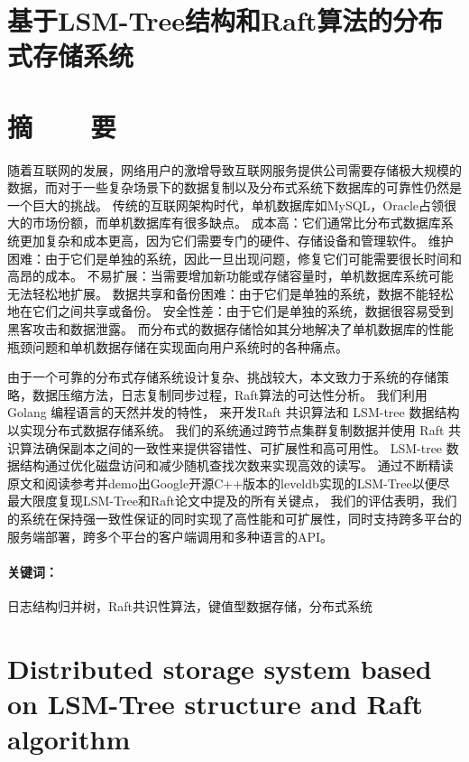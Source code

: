 \section*{基于LSM-Tree结构和Raft算法的分布式存储系统}
\section*{摘\ \ \ \ 要}

随着互联网的发展，网络用户的激增导致互联网服务提供公司需要存储极大规模的数据，而对于一些复杂场景下的数据复制以及分布式系统下数据库的可靠性仍然是一个巨大的挑战。
传统的互联网架构时代，单机数据库如MySQL，Oracle占领很大的市场份额，而单机数据库有很多缺点。
成本高：它们通常比分布式数据库系统更加复杂和成本更高，因为它们需要专门的硬件、存储设备和管理软件。
维护困难：由于它们是单独的系统，因此一旦出现问题，修复它们可能需要很长时间和高昂的成本。
不易扩展：当需要增加新功能或存储容量时，单机数据库系统可能无法轻松地扩展。
数据共享和备份困难：由于它们是单独的系统，数据不能轻松地在它们之间共享或备份。
安全性差：由于它们是单独的系统，数据很容易受到黑客攻击和数据泄露。
而分布式的数据存储恰如其分地解决了单机数据库的性能瓶颈问题和单机数据存储在实现面向用户系统时的各种痛点。


由于一个可靠的分布式存储系统设计复杂、挑战较大，本文致力于系统的存储策略，数据压缩方法，日志复制同步过程，Raft算法的可达性分析。
我们利用 Golang 编程语言的天然并发的特性， 来开发Raft 共识算法和 LSM-tree 数据结构以实现分布式数据存储系统。 
我们的系统通过跨节点集群复制数据并使用 Raft 共识算法确保副本之间的一致性来提供容错性、可扩展性和高可用性。 LSM-tree 数据结构通过优化磁盘访问和减少随机查找次数来实现高效的读写。 
通过不断精读原文和阅读参考并demo出Google开源C++版本的leveldb实现的LSM-Tree以便尽最大限度复现LSM-Tree和Raft论文中提及的所有关键点，
我们的评估表明，我们的系统在保持强一致性保证的同时实现了高性能和可扩展性，同时支持跨多平台的服务端部署，跨多个平台的客户端调用和多种语言的API。

\paragraph{关键词：} 日志结构归并树，Raft共识性算法，键值型数据存储，分布式系统

\clearpage


\section*{Distributed storage system based on LSM-Tree structure and Raft algorithm}

